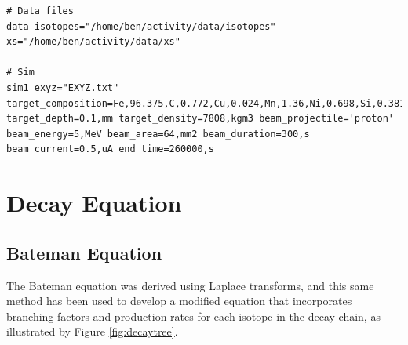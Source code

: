 \documentclass[12pt,twoside]{manual}
\begin{document}
\begin{lstlisting}[style=inputfile, caption={}]
# Data files
data isotopes="/home/ben/activity/data/isotopes" xs="/home/ben/activity/data/xs"

# Sim
sim1 exyz="EXYZ.txt" target_composition=Fe,96.375,C,0.772,Cu,0.024,Mn,1.36,Ni,0.698,Si,0.381,Cr,0.092,V,0.008,P,0.009,Si,0.003,Mo,0.278 target_depth=0.1,mm target_density=7808,kgm3 beam_projectile='proton' beam_energy=5,MeV beam_area=64,mm2 beam_duration=300,s beam_current=0.5,uA end_time=260000,s
\end{lstlisting}










\chapter{Decay Equation}

\section{Bateman Equation}


The Bateman equation was derived using Laplace transforms, and this same method has been used to develop a modified equation that incorporates branching factors and production rates for each isotope in the decay chain, as illustrated by Figure \ref{fig:decaytree}.
\end{document}
